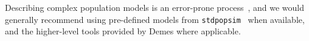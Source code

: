 \documentclass[graybox]{svmult}
\newcommand{\msprime}[0]{\texttt{msprime}}
\begin{document}
Describing complex population models is an error-prone
process~\citep{ragsdale2020lessons}, and we would generally recommend using
pre-defined models from \texttt{stdpopsim}~\citep{
adrion2020stdpopsim,lauterbur2023expanding,gower2025accessible} when available,
and the higher-level tools provided by Demes where applicable.





\end{document}
